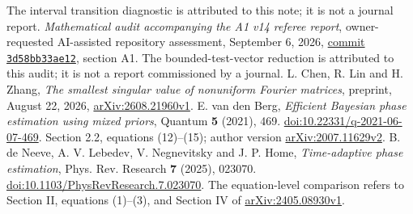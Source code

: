 \documentclass[11pt]{amsart}
\theoremstyle{definition}\newtheorem{definition}[theorem]{Definition}
\theoremstyle{remark}\newtheorem{remark}[theorem]{Remark}
\begin{document}
{The interval transition diagnostic is attributed to this note;
it is not a journal report.
\emph{Mathematical audit accompanying the A1 v14 referee report},
owner-requested AI-assisted repository assessment, September 6, 2026,
\href{https://github.com/TrillionniumFoundation/theta-theory/blob/3d58bb33ae122ebb2430874e2a57a5863e6a876a/reviews/a1-english-v14-geometric-2026-09-06/MATHEMATICAL_AUDIT.md}{commit \texttt{3d58bb33ae12}}, section A1.
The bounded-test-vector reduction is attributed to this audit;
it is not a report commissioned by a journal.
L. Chen, R. Lin and H. Zhang,
\emph{The smallest singular value of nonuniform Fourier matrices},
preprint, August 22, 2026,
\href{https://arxiv.org/abs/2608.21960v1}{arXiv:2608.21960v1}.
E. van den Berg, \emph{Efficient Bayesian phase estimation using mixed
priors}, Quantum \textbf{5} (2021), 469.
\href{https://doi.org/10.22331/q-2021-06-07-469}{doi:10.22331/q-2021-06-07-469}.
Section 2.2, equations (12)--(15); author version
\href{https://arxiv.org/abs/2007.11629v2}{arXiv:2007.11629v2}.
B. de Neeve, A. V. Lebedev, V. Negnevitsky and J. P. Home,
\emph{Time-adaptive phase estimation}, Phys. Rev. Research
\textbf{7} (2025), 023070.
\href{https://doi.org/10.1103/PhysRevResearch.7.023070}{doi:10.1103/PhysRevResearch.7.023070}.
The equation-level comparison refers to Section II, equations (1)--(3),
and Section IV of \href{https://arxiv.org/html/2405.08930v1}{arXiv:2405.08930v1}.

\VnineEndBibliography}
\end{document}
